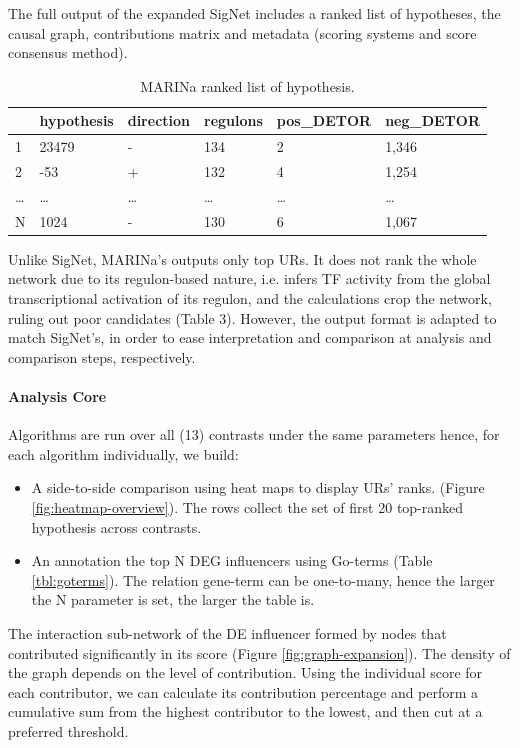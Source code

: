 The full output of the expanded SigNet includes a ranked list of hypotheses, the causal graph, contributions matrix and metadata (scoring systems and score consensus method).

\begin{table}[!h]
\centering
\begin{tabular}{|l|l|l|l|l|l|}
\hline
  & hypothesis & direction & regulons & pos\_DETOR & neg\_DETOR \\ \hline
1 & 23479      & -         & 134      & 2          & 1,346      \\ \hline
2 & -53        & +         & 132      & 4          & 1,254      \\ \hline
… & …          & …         & …        & …          & …          \\ \hline
N & 1024       & -         & 130      & 6          & 1,067      \\ \hline
\end{tabular}
\caption{MARINa ranked list of hypothesis.}
\label{tbl:marina_output}
\end{table}

Unlike SigNet, MARINa’s outputs only top URs. It does not rank the whole network due to its regulon-based nature, i.e. infers TF activity from the global transcriptional activation of its regulon, and the calculations crop the network, ruling out poor candidates (Table 3). 
However, the output format is adapted to match SigNet’s, in order to ease interpretation and comparison at analysis and comparison steps, respectively.

\paragraph{Analysis Core}
Algorithms are run over all (13) contrasts under the same parameters hence, for each algorithm individually, we build:

\begin{itemize}
    \item A side-to-side comparison using heat maps to display URs’ ranks. (Figure \ref{fig:heatmap-overview}). The rows collect the set of first 20 top-ranked hypothesis across contrasts.
    \item An annotation the top N DEG influencers using Go-terms (Table \ref{tbl:goterms}). The relation gene-term can be one-to-many, hence the larger the N parameter is set, the larger the table is.
\end{itemize}

The interaction sub-network of the DE influencer formed by nodes that contributed significantly in its score (Figure \ref{fig:graph-expansion}). The density of the graph depends on the level of contribution. Using the individual score for each contributor, we can calculate its contribution percentage and perform a cumulative sum from the highest contributor to the lowest, and then cut at a preferred threshold. 
\\

